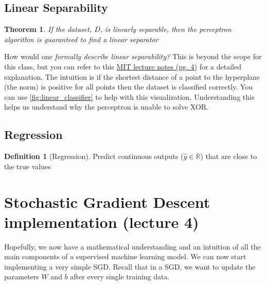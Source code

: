 \documentclass[11pt]{article}
\numberwithin{equation}{section}
\theoremstyle{definition}%
\newtheorem{theorem}{Theorem}
\newtheorem{definition}{Definition}[section]%
\begin{document}

\subsection{Linear Separability}


\begin{theorem}
    \emph{If the dataset, $D$, is linearly separable, then the perceptron algorithm is guaranteed to find a linear separator} \cite{MIT}
\end{theorem}

How would one \emph{formally describe linear separability?} This is beyond the scope for this class, but you can refer to this \href{https://openlearninglibrary.mit.edu/assets/courseware/v1/8f4f9aca5581dde50291b0d0e29d0148/asset-v1:MITx+6.036+1T2019+type@asset+block/notes_chapter_The_Perceptron.pdf}{MIT lecture notes (pg. 4)} for a detailed explanation. The intuition is if the shortest distance of a point to the hyperplane (the norm) is positive for all points then the dataset is classified correctly. You can use \autoref{fig:linear_classifier} to help with this visualization. Understanding this helps us understand why the perceptron is unable to solve XOR.

\subsection{Regression}

\begin{definition}[Regression]
    Predict continuous outputs ($\hat{y} \in \mathbb{R}$) that are close to the true values
\end{definition}

\section{Stochastic Gradient Descent implementation (lecture 4)}

Hopefully, we now have a mathematical understanding and an intuition of all the main components of a supervised machine learning model. We can now start implementing a very simple SGD. Recall that in a SGD, we want to update the parameters $W$ and $b$ after every single training data.
\end{document}
